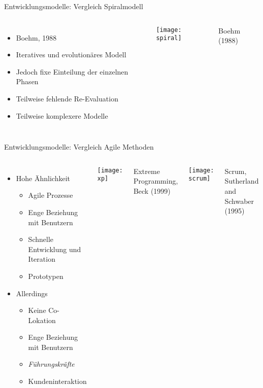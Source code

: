 \documentclass[11pt]{beamer}
\newlength{\colwidth}
\begin{document}
\begin{frame}{Entwicklungsmodelle: Vergleich Spiralmodell}
  \begin{center}
  \begin{columns}[T]
  \column{\colwidth}
  \begin{itemize}
    \item Boehm, 1988
    \item Iteratives und evolutionäres Modell
    \item Jedoch fixe Einteilung der einzelnen Phasen
    \item Teilweise fehlende Re-Evaluation
    \item Teilweise komplexere Modelle
  \end{itemize}
  \column{\colwidth}
  \texttt{[image: spiral]}

  {\tiny\hfill
  Boehm (1988)
  }

  \end{columns}
  \end{center}
\end{frame}

\begin{frame}{Entwicklungsmodelle: Vergleich Agile Methoden}
  \begin{center}
  \begin{columns}[T]
  \begin{itemize}
    \item Hohe Ähnlichkeit
    \begin{itemize}
      \item Agile Prozesse
      \item Enge Beziehung mit Benutzern
      \item Schnelle Entwicklung und Iteration
      \item Prototypen
    \end{itemize}
    \item Allerdings
    \begin{itemize}
      \item Keine Co-Lokation
      \item Enge Beziehung mit Benutzern
      \item \emph{Führungskräfte}
      \item Kundeninteraktion
    \end{itemize}
  \end{itemize}
  \texttt{[image: xp]}

  {\tiny\hfill
  Extreme Programming, Beck (1999)
  }
  \vspace{1em}

  \texttt{[image: scrum]}

  {\tiny\hfill
  Scrum, Sutherland and Schwaber (1995)
  }
  \end{columns}
  \end{center}
\end{frame}
\end{document}
